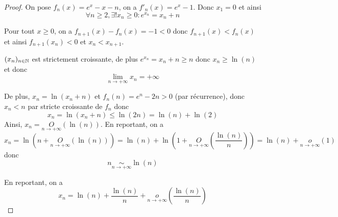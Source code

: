 \documentclass[12pt]{article}
\begin{document}
\begin{proof}
	On pose $f_{n}(x)=e^{x}-x-n$, on a $f'_{n}(x)=e^{x}-1$. Donc $x_{1}=0$ et ainsi 
	\begin{equation}\boxed{\forall n\geqslant 2,\exists! x_n\geqslant0\colon e^{x_{n}}=x_{n}+n}\end{equation}

	Pour tout $x\geqslant0$, on a $f_{n+1}(x)-f_{n}(x)=-1<0$ donc $f_{n+1}(x)<f_{n}(x)$ et ainsi $f_{n+1}(x_{n})<0$ et $x_{n}<x_{n+1}$.

	$(x_{n})_{n\in\mathbb{N}}$ est strictement croissante, de plus $e^{x_{n}}=x_{n}+n\geqslant n$ donc $x_{n}\geqslant \ln(n)$ et donc 
	\begin{equation}\boxed{\lim\limits_{n\to+\infty}x_{n}=+\infty}\end{equation}

	De plus, $x_{n}=\ln(x_{n}+n)$ et $f_{n}(n)=e^{n}-2n>0$ (par récurrence), donc $x_{n}<n$ par stricte croissante de $f_{n}$ donc 
	\begin{equation}x_{n}=\ln(x_{n}+n)\leqslant \ln(2n)=\ln(n)+\ln(2)\end{equation}
	Ainsi, $x_{n}=\underset{n\to+\infty}{O}(\ln(n))$. En reportant, on a 
	\begin{equation}x_{n}=\ln(n+\underset{n\to+\infty}{O}(\ln(n)))=\ln(n)+\ln(1+\underset{n\to+\infty}{O}\left(\frac{\ln(n)}{n}\right))=\ln(n)+\underset{n\to+\infty}{o}(1)\end{equation}
	donc 
	\begin{equation}\boxed{n\underset{n\to+\infty}{\sim}\ln(n)}\end{equation}

	En reportant, on a 
	\begin{equation}\boxed{x_{n}=\ln(n)+\frac{\ln(n)}{n}+\underset{n\to+\infty}{o}\left(\frac{\ln(n)}{n}\right)}\end{equation}
\end{proof}
\end{document}
